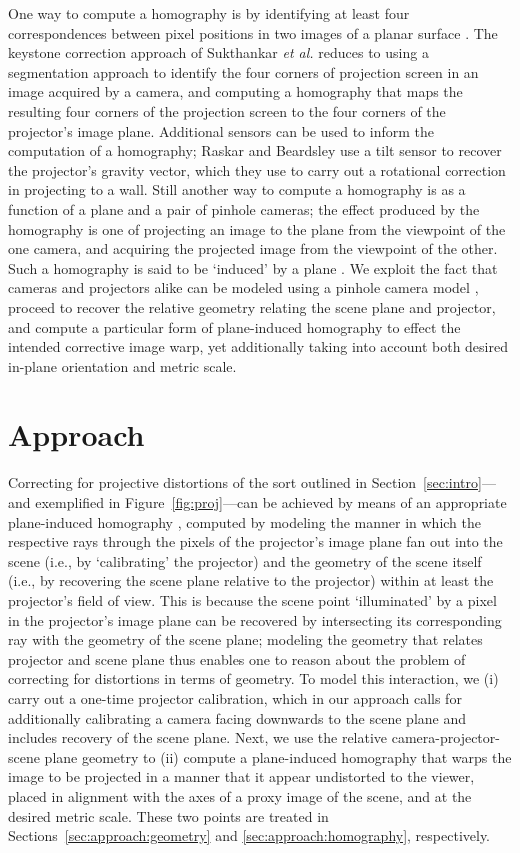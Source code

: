 \documentclass[review]{elsarticle}
\begin{document}
One way to compute a homography is by identifying at least four correspondences between pixel positions in two images of a planar surface \cite{Hartley2004}. The keystone correction approach of Sukthankar \textit{et al.} \cite{sukthankar2001smarter} reduces to using a segmentation approach to identify the four corners of projection screen in an image acquired by a camera, and computing a homography that maps the resulting four corners of the projection screen to the four corners of the projector's image plane. Additional sensors can be used to inform the computation of a homography; Raskar and Beardsley \cite{raskar2001self} use a tilt sensor to recover the projector's gravity vector, which they use to carry out a rotational correction in projecting to a wall. Still another way to compute a homography is as a function of a plane and a pair of pinhole cameras; the effect produced by the homography is one of projecting an image to the plane from the viewpoint of the one camera, and acquiring the projected image from the viewpoint of the other. Such a homography is said to be `induced' by a plane \cite{Hartley2004}. We exploit the fact that cameras and projectors alike can be modeled using a pinhole camera model \cite{bimber2019spatial}, proceed to recover the relative geometry relating the scene plane and projector, and compute a particular form of plane-induced homography to effect the intended corrective image warp, yet additionally taking into account both desired in-plane orientation and metric scale.

\section{Approach}

Correcting for projective distortions of the sort outlined in Section~\ref{sec:intro}---and exemplified in Figure~\ref{fig:proj}---can be achieved by means of an appropriate plane-induced homography \cite{Hartley2004}, computed by modeling the manner in which the respective rays through the pixels of the projector's image plane fan out into the scene (i.e., by `calibrating' the projector) and the geometry of the scene itself (i.e., by recovering the scene plane relative to the projector) within at least the projector's field of view. This is because the scene point `illuminated' by a pixel in the projector's image plane can be recovered by intersecting its corresponding ray with the geometry of the scene plane; modeling the geometry that relates projector and scene plane thus enables one to reason about the problem of correcting for distortions in terms of geometry. To model this interaction, we (i) carry out a one-time projector calibration, which in our approach calls for additionally calibrating a camera facing downwards to the scene plane and includes recovery of the scene plane. Next, we use the relative camera-projector-scene plane geometry to (ii) compute a plane-induced homography that warps the image to be projected in a manner that it appear undistorted to the viewer, placed in alignment with the axes of a proxy image of the scene, and at the desired metric scale. These two points are treated in Sections~\ref{sec:approach:geometry} and \ref{sec:approach:homography}, respectively.
\end{document}
